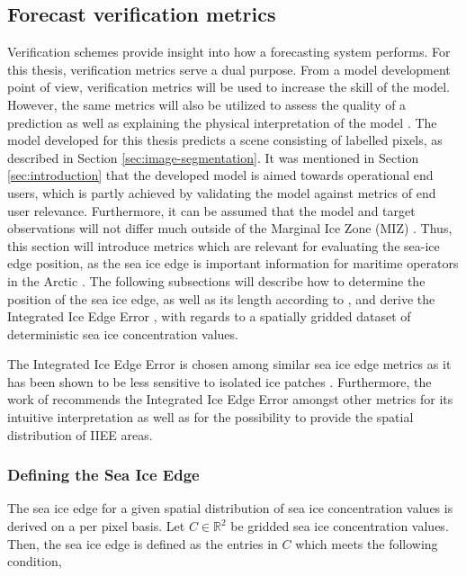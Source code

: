 \documentclass[../main/thesis.tex]{subfiles}
\begin{document}
\subsection{Forecast verification metrics}
Verification schemes provide insight into how a forecasting system performs. For this thesis, verification metrics serve a dual purpose. From a model development point of view, verification metrics will be used to increase the skill of the model. However, the same metrics will also be utilized to assess the quality of a prediction as well as explaining the physical interpretation of the model \citep{Casati2008}. The model developed for this thesis predicts a scene consisting of labelled pixels, as described in Section \ref{sec:image-segmentation}. It was mentioned in Section \ref{sec:introduction} that the developed model is aimed towards operational end users, which is partly achieved by validating the model against metrics of end user relevance. Furthermore, it can be assumed that the model and target observations will not differ much outside of the Marginal Ice Zone (MIZ) \citep{Fritzner2020}. Thus, this section will introduce metrics which are relevant for evaluating the sea-ice edge position, as the sea ice edge is important information for maritime operators in the Arctic \citep{Melsom2019}. The following subsections will describe how to determine the position of the sea ice edge, as well as its length according to \citet{Melsom2019}, and derive the Integrated Ice Edge Error \citep{Goessling2016}, with regards to a spatially gridded dataset of deterministic sea ice concentration values.

The Integrated Ice Edge Error is chosen among similar sea ice edge metrics \citep{Melsom2019, Dukhovskoy2015} as it has been shown to be less sensitive to isolated ice patches \citep{Palerme2019}. Furthermore, the work of \citet{Melsom2019} recommends the Integrated Ice Edge Error amongst other metrics for its intuitive interpretation as well as for the possibility to provide the spatial distribution of IIEE areas.

\subsubsection{Defining the Sea Ice Edge}
\label{sec:iceedgelength}
The sea ice edge for a given spatial distribution of sea ice concentration values is derived on a per pixel basis. Let $C \in{\mathbb{R}^2}$ be gridded sea ice concentration values. Then, the sea ice edge is defined as the entries in $C$ which meets the following condition,
\end{document}
